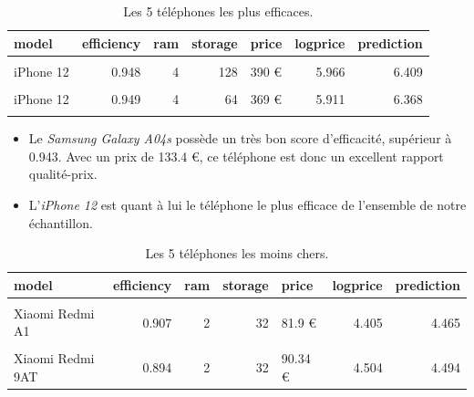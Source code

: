 \documentclass[
  12pt,
]{report}
\begin{document}
\begin{table}[!h]
\centering
\caption{\label{tab:best}Les 5 téléphones les plus efficaces.}
\centering
\begin{tabular}[t]{lrrrlrr}
\toprule
\textbf{model} & \textbf{efficiency} & \textbf{ram} & \textbf{storage} & \textbf{price} & \textbf{logprice} & \textbf{prediction}\\
\midrule
\cellcolor{gray!10}{Samsung Galaxy A04s} & \cellcolor{gray!10}{0.943} & \cellcolor{gray!10}{3} & \cellcolor{gray!10}{32} & \cellcolor{gray!10}{133.4 €} & \cellcolor{gray!10}{4.893} & \cellcolor{gray!10}{5.265}\\
iPhone 12 & 0.948 & 4 & 128 & 390 € & 5.966 & 6.409\\
\cellcolor{gray!10}{iPhone 12} & \cellcolor{gray!10}{0.949} & \cellcolor{gray!10}{4} & \cellcolor{gray!10}{64} & \cellcolor{gray!10}{369 €} & \cellcolor{gray!10}{5.911} & \cellcolor{gray!10}{\vphantom{2} 6.368}\\
iPhone 12 & 0.949 & 4 & 64 & 369 € & 5.911 & \vphantom{1} 6.368\\
\cellcolor{gray!10}{iPhone 12} & \cellcolor{gray!10}{0.949} & \cellcolor{gray!10}{4} & \cellcolor{gray!10}{64} & \cellcolor{gray!10}{369 €} & \cellcolor{gray!10}{5.911} & \cellcolor{gray!10}{6.368}\\
\bottomrule
\end{tabular}
\end{table}

\begin{itemize}
\item
  Le \emph{Samsung Galaxy A04s} possède un très bon score d'efficacité,
  supérieur à 0.943. Avec un prix de 133.4 €, ce téléphone est donc un
  excellent rapport qualité-prix.
\item
  L'\emph{iPhone 12} est quant à lui le téléphone le plus efficace de
  l'ensemble de notre échantillon.
\end{itemize}

\begin{table}[!h]
\centering
\caption{\label{tab:kbl_expensive}Les 5 téléphones les moins chers.}
\centering
\begin{tabular}[t]{lrrrlrr}
\toprule
\textbf{model} & \textbf{efficiency} & \textbf{ram} & \textbf{storage} & \textbf{price} & \textbf{logprice} & \textbf{prediction}\\
\midrule
\cellcolor{gray!10}{Motorola E13} & \cellcolor{gray!10}{0.906} & \cellcolor{gray!10}{2} & \cellcolor{gray!10}{64} & \cellcolor{gray!10}{79 €} & \cellcolor{gray!10}{4.369} & \cellcolor{gray!10}{4.424}\\
Xiaomi Redmi A1 & 0.907 & 2 & 32 & 81.9 € & 4.405 & 4.465\\
\cellcolor{gray!10}{Xiaomi Redmi 9A} & \cellcolor{gray!10}{0.901} & \cellcolor{gray!10}{2} & \cellcolor{gray!10}{32} & \cellcolor{gray!10}{84.6 €} & \cellcolor{gray!10}{4.438} & \cellcolor{gray!10}{4.467}\\
Xiaomi Redmi 9AT & 0.894 & 2 & 32 & 90.34 € & 4.504 & 4.494\\
\bottomrule
\end{tabular}
\end{table}
\end{document}
